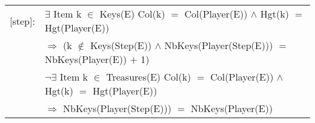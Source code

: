 \documentclass[8pt]{article}
\begin{document}
{\begin{longtable}{rl}
    \textrm{[step]}:& $\exists$ \textrm{Item} k $\in$ \textrm{Keys(E)} \textrm{Col(k)} $=$ \textrm{Col(Player(E))} $\land$ \textrm{Hgt(k)} $=$ \textrm{Hgt(Player(E))}\\
  & \quad\quad $\Rightarrow$ (k $\notin$ Keys(Step(E)) $\land$ \textrm{NbKeys(Player(Step(E)))} $=$ \textrm{NbKeys(Player(E))} $+$ 1)\\
  & $\neg$$\exists$ \textrm{Item} k $\in$ \textrm{Treasures(E)} \textrm{Col(k)} $=$ \textrm{Col(Player(E))} $\land$ \textrm{Hgt(k)} $=$ \textrm{Hgt(Player(E))}\\
  & \quad\quad $\Rightarrow$ \textrm{NbKeys(Player(Step(E)))} $=$ \textrm{NbKeys(Player(E))}\\
  \end{longtable}}
\end{document}
